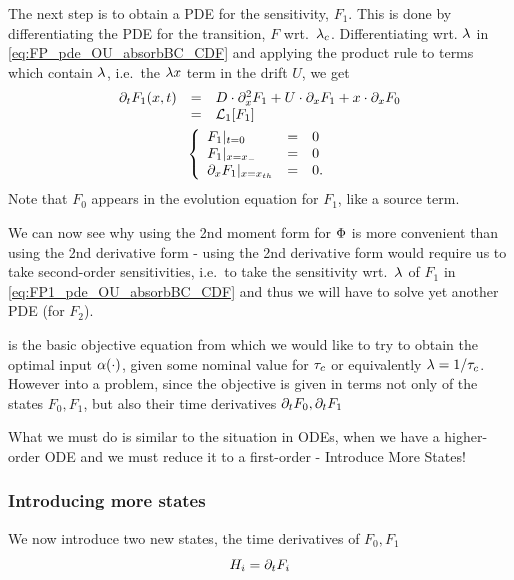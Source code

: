 \documentclass{article}
\begin{document}
The next step is to obtain a PDE for the sensitivity, $F_1$. This is done by
differentiating the PDE for the transition, $F$ wrt.\ ${ \lambda_{c} }$. Differentiating
wrt. ${\lambda}$ in \cref{eq:FP_pde_OU_absorbBC_CDF} and applying the product rule to
terms which contain ${\lambda}$, i.e.\ the ${\lambda} x$ term in the drift $U$, we get
\begin{equation}
\begin{gathered}
\begin{array}{lcl}
	{\partial}_t F_1(x,t) &=&
					D \cdot {\partial}^2_x F_1 +  
					U  \cdot {\partial}_x F_1 + 
					x \cdot {\partial}_x F_0
	\\
	&=&
					{ \mathcal{L} }_1 [ F_1]
\end{array}
	\\
	\left\{ \begin{array}{lcl}
	F_1 |_{t = 0} &=& 0
	\\
	F_1 |_{x={ x_{-} }} &=& 0 
	\\
	{\partial}_xF_1 |_{x={ x_{th} }} &=& 0.
	\end{array} \right.
\label{eq:FP1_pde_OU_absorbBC_CDF}
\end{gathered}
\end{equation}
Note that $F_0$ appears in the evolution equation for $F_1$, like a source term.

We can now see why using the 2nd moment form for ${\Phi}$ is more
convenient than using the 2nd derivative form - using the
2nd derivative form would require us to take second-order
sensitivities, i.e.\ to take the sensitivity wrt.\ ${\lambda}$ of $F_1$ in
\cref{eq:FP1_pde_OU_absorbBC_CDF} and thus we will have to solve yet another
PDE (for $F_2$).
 
 is the basic
objective equation from which we would like to try to obtain the optimal
input ${\alpha}(\cdot)$, given some nominal value for ${ \tau_{c} }$ or equivalently
${\lambda} = 1/{ \tau_{c} }$. However into a problem, since the objective is given in terms not
only of the states $F_0, F_1$, but also their time derivatives ${\partial}_t F_0, {\partial}_t
F_1$

What we must do is similar to the situation in ODEs, when we have a higher-order
ODE and we must reduce it to a first-order - Introduce More States!

\subsubsection{Introducing more states}
\label{sec:time_derivative_differential_subtleties}
We now introduce two new states, the time derivatives of $F_0, F_1$
$$
H_i = {\partial}_t F_i
$$
\end{document}
